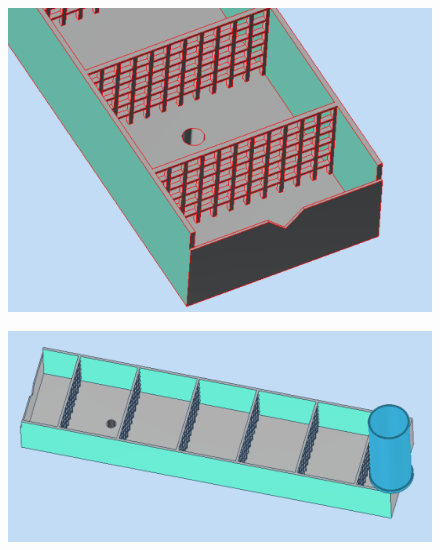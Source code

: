 \documentclass[a4paper,12pt]{report}
\begin{document}
\begin{figure}[H]
\centering
\includegraphics[scale=0.75]{anexo2.png}
\end{figure}
\begin{figure}[H]
\centering
\includegraphics[scale=0.9]{anexo3.png}
\end{figure}
\end{document}
